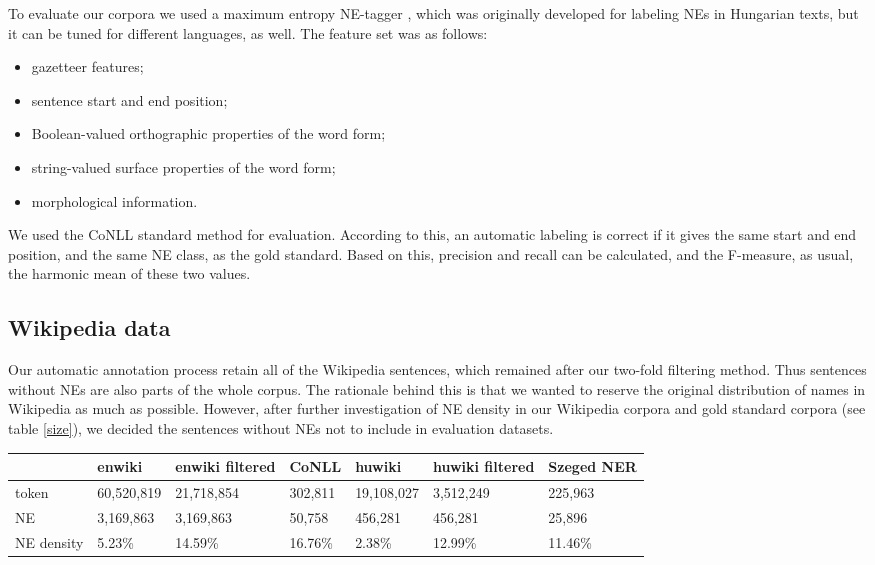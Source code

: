 \documentclass[11pt]{article}
\begin{document}
To evaluate our corpora we used a maximum entropy NE-tagger \cite{Varga:07}, which was originally developed for labeling NEs in Hungarian texts, but it can be tuned for different languages, as well. The feature set was as follows:

\begin{itemize}
\item gazetteer features;
\item sentence start and end position;
\item Boolean-valued orthographic properties of the word form;
\item string-valued surface properties of the word form;
\item morphological information.
\end{itemize}

We used the CoNLL standard method for evaluation. According to this, an automatic labeling is correct if it gives the same start and end position, and the same NE class, as the gold standard. Based on this, precision and recall can be calculated, and the F-measure, as usual, the harmonic mean of these two values.  

\subsection{Wikipedia data}

Our automatic annotation process retain all of the Wikipedia sentences, which remained after our two-fold filtering method. Thus sentences without NEs are also parts of the whole corpus. The rationale behind this is that we wanted to reserve the original distribution of names in Wikipedia as much as possible. However, after further investigation of NE density in our Wikipedia corpora and gold standard corpora (see table \ref{size}), we decided the sentences without NEs not to include in evaluation datasets. 

\begin{table*}[ht]
\begin{center}
\begin{tabular}{lllllll}
\hline  & \bf enwiki & \bf enwiki filtered & \bf CoNLL & \bf huwiki & \bf huwiki filtered  & \bf Szeged NER \\ \hline
token & 60,520,819 & 21,718,854 & 302,811 &  19,108,027 & 3,512,249  & 225,963\\
NE & 3,169,863 & 3,169,863 & 50,758 & 456,281 & 456,281  & 25,896\\
NE density & 5.23\% & 14.59\% & 16.76\% & 2.38\% & 12.99\%  & 11.46\%\\
\hline
\end{tabular}
\end{center}
\caption{\label{size} Corpus size and NE-density. }
\end{table*}
\end{document}
